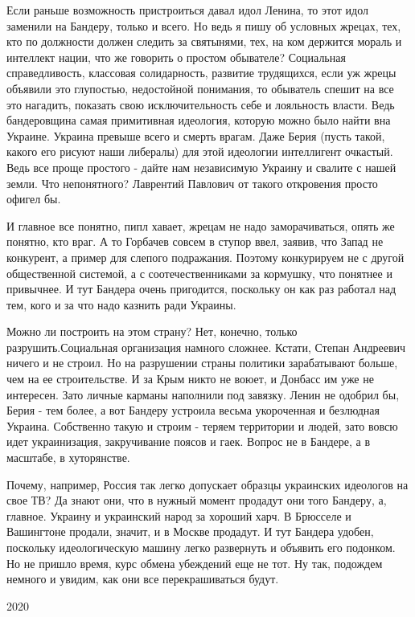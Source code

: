 Если раньше возможность пристроиться давал идол Ленина, то этот идол заменили
на Бандеру, только и всего. Но ведь я пишу об условных жрецах, тех, кто по
должности должен следить за святынями, тех, на ком держится мораль и интеллект
нации, что же говорить о простом обывателе? Социальная справедливость,
классовая солидарность, развитие трудящихся, если уж жрецы объявили это
глупостью, недостойной понимания, то обыватель спешит на все это нагадить,
показать свою исключительность себе и лояльность власти. Ведь бандеровщина
самая примитивная идеология, которую можно было найти вна Украине. Украина
превыше всего и смерть врагам. Даже Берия (пусть такой, какого его рисуют наши
либералы) для этой идеологии интеллигент очкастый. Ведь все проще простого -
дайте нам независимую Украину и свалите с нашей земли. Что непонятного?
Лаврентий Павлович от такого откровения просто офигел бы. 

И главное все понятно, пипл хавает, жрецам не надо заморачиваться, опять же
понятно, кто враг. А то Горбачев совсем в ступор ввел, заявив, что Запад не
конкурент, а пример для слепого подражания. Поэтому конкурируем не с другой
общественной системой, а с соотечественниками за кормушку, что понятнее и
привычнее. И тут Бандера очень пригодится, поскольку он как раз работал над
тем, кого и за что надо казнить ради Украины. 

Можно ли построить на этом страну? Нет, конечно, только разрушить.Социальная
организация намного сложнее. Кстати, Степан Андреевич ничего и не строил. Но на
разрушении страны политики зарабатывают больше, чем на ее строительстве. И за
Крым никто не воюет, и Донбасс им уже не интересен. Зато личные карманы
наполнили под завязку. Ленин не одобрил бы, Берия - тем более, а вот Бандеру
устроила весьма укороченная и безлюдная Украина. Собственно такую и строим -
теряем территории и людей, зато вовсю идет украинизация, закручивание поясов и
гаек. Вопрос не в Бандере, а в масштабе, в хуторянстве. 

Почему, например, Россия так легко допускает образцы украинских идеологов на
свое ТВ? Да знают они, что в нужный момент продадут они того Бандеру, а,
главное. Украину и украинский народ за хороший харч. В Брюсселе и Вашингтоне
продали, значит, и в Москве продадут. И тут Бандера удобен, поскольку
идеологическую машину легко развернуть и объявить его подонком. Но не пришло
время, курс обмена убеждений еще не тот. Ну так, подождем немного и увидим, как
они все перекрашиваться будут.

2020

